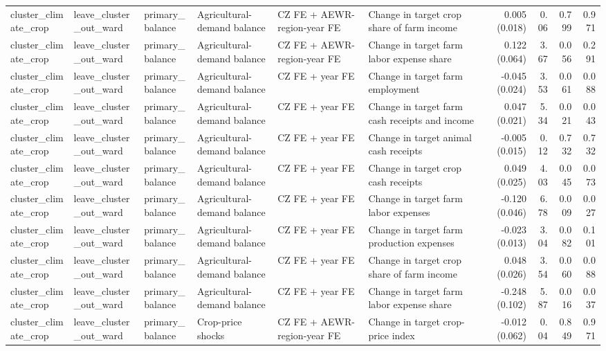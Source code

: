 \begin{tabular}{llllllrrrr}
cluster_climate_crop & leave_cluster_out_ward & primary_balance & Agricultural-demand balance & CZ FE + AEWR-region-year FE & Change in target crop share of farm income & 0.005 (0.018) & 0.06 & 0.799 & 0.971 \\
cluster_climate_crop & leave_cluster_out_ward & primary_balance & Agricultural-demand balance & CZ FE + AEWR-region-year FE & Change in target farm labor expense share & 0.122 (0.064) & 3.67 & 0.056 & 0.291 \\
cluster_climate_crop & leave_cluster_out_ward & primary_balance & Agricultural-demand balance & CZ FE + year FE & Change in target farm employment & -0.045 (0.024) & 3.53 & 0.061 & 0.088 \\
cluster_climate_crop & leave_cluster_out_ward & primary_balance & Agricultural-demand balance & CZ FE + year FE & Change in target farm cash receipts and income & 0.047 (0.021) & 5.34 & 0.021 & 0.043 \\
cluster_climate_crop & leave_cluster_out_ward & primary_balance & Agricultural-demand balance & CZ FE + year FE & Change in target animal cash receipts & -0.005 (0.015) & 0.12 & 0.732 & 0.732 \\
cluster_climate_crop & leave_cluster_out_ward & primary_balance & Agricultural-demand balance & CZ FE + year FE & Change in target crop cash receipts & 0.049 (0.025) & 4.03 & 0.045 & 0.073 \\
cluster_climate_crop & leave_cluster_out_ward & primary_balance & Agricultural-demand balance & CZ FE + year FE & Change in target farm labor expenses & -0.120 (0.046) & 6.78 & 0.009 & 0.027 \\
cluster_climate_crop & leave_cluster_out_ward & primary_balance & Agricultural-demand balance & CZ FE + year FE & Change in target farm production expenses & -0.023 (0.013) & 3.04 & 0.082 & 0.101 \\
cluster_climate_crop & leave_cluster_out_ward & primary_balance & Agricultural-demand balance & CZ FE + year FE & Change in target crop share of farm income & 0.048 (0.026) & 3.54 & 0.060 & 0.088 \\
cluster_climate_crop & leave_cluster_out_ward & primary_balance & Agricultural-demand balance & CZ FE + year FE & Change in target farm labor expense share & -0.248 (0.102) & 5.87 & 0.016 & 0.037 \\
cluster_climate_crop & leave_cluster_out_ward & primary_balance & Crop-price shocks & CZ FE + AEWR-region-year FE & Change in target crop-price index & -0.012 (0.062) & 0.04 & 0.849 & 0.971 \\

\end{tabular}
